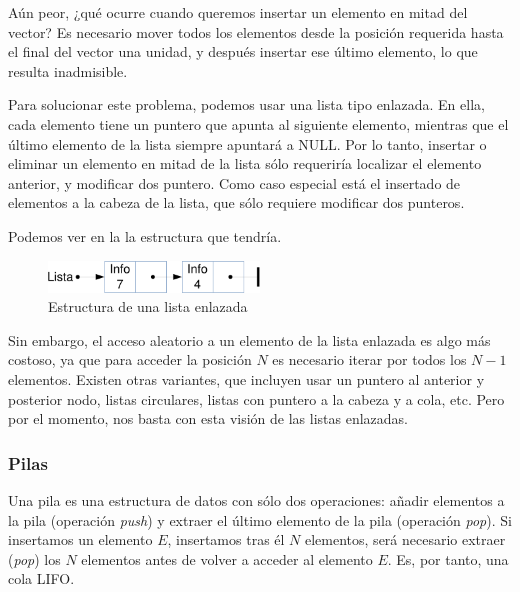 Aún peor, ¿qué ocurre cuando queremos insertar un elemento en mitad del vector? Es necesario mover todos los elementos 
desde la posición requerida hasta el final del vector una unidad, y después insertar ese último elemento, lo que 
resulta inadmisible.

Para solucionar este problema, podemos usar una lista tipo enlazada. En ella, cada elemento tiene un puntero que apunta 
al siguiente elemento, mientras que el último elemento de la lista siempre apuntará a NULL. Por lo tanto, insertar o 
eliminar un elemento en mitad de la lista sólo requeriría localizar el elemento anterior, y modificar dos puntero. Como 
caso especial está el insertado de elementos a la cabeza de la lista, que sólo requiere modificar dos punteros.

Podemos ver en la  la estructura que tendría.

\begin{figure}[htbp]
\centering
\includegraphics[width=0.5\textwidth]{CapituloEstructura/Figuras/EstructuraListaEnlazada-crop}
\caption{Estructura de una lista enlazada}
\end{figure}
%

Sin embargo, el acceso aleatorio a un elemento de la lista enlazada es algo más costoso, ya que para acceder la 
posición $N$ es necesario iterar por todos los $N-1$ elementos. Existen otras variantes, que incluyen usar un puntero 
al anterior y posterior nodo, listas circulares, listas con puntero a la cabeza y a cola, etc. Pero por el momento, nos 
basta con esta visión de las listas enlazadas.


\subsubsection{Pilas}
Una pila es una estructura de datos con sólo dos operaciones: añadir elementos a la pila (operación \emph{push}) y 
extraer el último elemento de la pila (operación \emph{pop}). Si insertamos un elemento $E$, insertamos tras él $N$ 
elementos, será necesario extraer (\emph{pop}) los $N$ elementos antes de volver a acceder al elemento $E$. Es, por 
tanto, una cola \gls{LIFO}.

